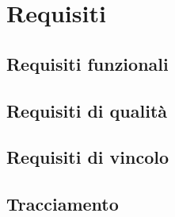 \documentclass[5pt]{article}
\begin{document}
\section{Requisiti}
\subsection{Requisiti funzionali}
\subsection{Requisiti di qualità}
\subsection{Requisiti di vincolo}
\subsection{Tracciamento}
\end{document}
